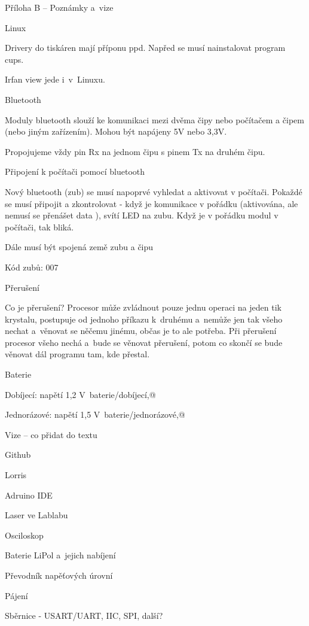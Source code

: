 


\nonum \sec Příloha B -- Poznámky a~vize

 \secc Linux

Drivery do tiskáren mají příponu ppd. Napřed se musí nainstalovat program cups. 

Irfan view jede i~v~Linuxu.



 \secc Bluetooth

 Moduly bluetooth slouží ke komunikaci mezi dvěma čipy nebo počítačem a čipem (nebo jiným zařízením). Mohou být napájeny 5V nebo 3,3V. 

Propojujeme vždy pin Rx na jednom čipu s pinem Tx na druhém čipu. 

\secc Připojení k počítači pomocí bluetooth

Nový bluetooth (zub) se musí napoprvé vyhledat a aktivovat v počítači. Pokaždé se musí připojit a zkontrolovat - když je komunikace v pořádku (aktivována, ale nemusí se přenášet data ), svítí LED na zubu. Když je v pořádku modul v počítači, tak bliká.  

Dále musí být spojená země zubu a čipu 

Kód zubů: 007 



\secc Přerušení

Co je přerušení? Procesor může zvládnout pouze jednu operaci na jeden tik krystalu, postupuje od jednoho příkazu k~druhému a~nemůže jen tak všeho nechat a~věnovat se něčemu jinému, občas je to ale potřeba. Při přerušení procesor všeho nechá a~bude se věnovat přerušení, potom co skončí se bude věnovat dál programu tam, kde přestal. 

\secc Baterie 

Dobíjecí: napětí 1,2 V~\ii baterie/dobíjecí,@

Jednorázové: napětí 1,5 V~\ii baterie/jednorázové,@ 
 
\secc Vize -- co přidat do textu 

Github

Lorris

Adruino IDE 

Laser ve Lablabu 

Osciloskop

Baterie LiPol a~jejich nabíjení 

Převodník napěťových úrovní 

Pájení 

Sběrnice - USART/UART, IIC, SPI, další?
